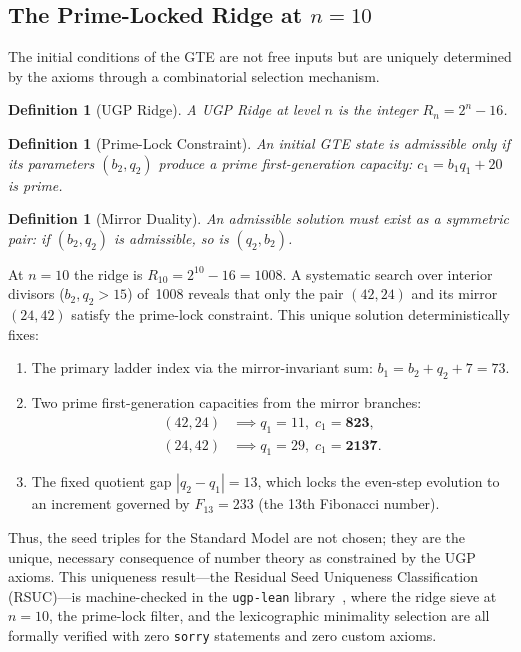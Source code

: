 \documentclass[11pt]{article}
\newtheorem{definition}[theorem]{Definition}
\theoremstyle{remark}
\begin{document}
\subsection{The Prime-Locked Ridge at \texorpdfstring{$n=10$}{n=10}}
\label{subsec:ridge}

The initial conditions of the GTE are not free inputs but are uniquely determined by the axioms through a combinatorial selection mechanism.

\begin{definition}[UGP Ridge]
A UGP Ridge at level $n$ is the integer $R_n = 2^n - 16$.
\end{definition}

\begin{definition}[Prime-Lock Constraint]
An initial GTE state is admissible only if its parameters $(b_2, q_2)$ produce a prime first-generation capacity: $c_1 = b_1 q_1 + 20$ is prime.
\end{definition}

\begin{definition}[Mirror Duality]
An admissible solution must exist as a symmetric pair: if $(b_2, q_2)$ is admissible, so is $(q_2, b_2)$.
\end{definition}

At $n{=}10$ the ridge is $R_{10} = 2^{10} - 16 = 1008$.
A systematic search over interior divisors ($b_2, q_2 > 15$) of~1008 reveals that only the pair $(42, 24)$ and its mirror $(24, 42)$ satisfy the prime-lock constraint.
This unique solution deterministically fixes:
\begin{enumerate}[leftmargin=1.2em,itemsep=0.15em]
    \item The primary ladder index via the mirror-invariant sum:
    $b_1 = b_2 + q_2 + 7 = 73.$
    \item Two prime first-generation capacities from the mirror branches:
    \begin{align*}
        (42, 24) &\implies q_1 = 11,\; c_1 = \mathbf{823}, \\
        (24, 42) &\implies q_1 = 29,\; c_1 = \mathbf{2137}.
    \end{align*}
    \item The fixed quotient gap $|q_2 - q_1| = 13$, which locks the even-step evolution to an increment governed by $F_{13} = 233$ (the 13th Fibonacci number).
\end{enumerate}

Thus, the seed triples for the Standard Model are not chosen; they are the unique, necessary consequence of number theory as constrained by the UGP axioms.
This uniqueness result---the Residual Seed Uniqueness Classification (RSUC)---is machine-checked in the \texttt{ugp-lean} library~\cite{SpivackUGPFormalization}, where the ridge sieve at $n{=}10$, the prime-lock filter, and the lexicographic minimality selection are all formally verified with zero \texttt{sorry} statements and zero custom axioms.
\end{document}
